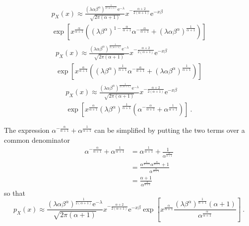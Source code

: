 \documentclass[12pt, a4paper]{memoir}
\newcommand{\euler}{\mathrm{e}}
\begin{document}
\begin{multline*}
p_X(x)\approx
\frac{\left(\lambda\alpha\beta^\alpha\right)^{\frac{1}{2(\alpha+1)}}\euler^{-\lambda}}{\sqrt{2\pi(\alpha+1)}}x^{-\frac{\alpha+2}{2(\alpha+1)}}
\euler^{-x\beta}
\\
\exp\left[x^{\frac{\alpha}{\alpha+1}}
	\left(
		(\lambda\beta^\alpha)^{1-\frac{\alpha}{\alpha+1}}\alpha^{-\frac{\alpha}{\alpha+1}}
		+\left(\lambda\alpha\beta^\alpha\right)^{\frac{1}{\alpha+1}}
	\right)
\right]
\end{multline*}
\begin{multline*}
p_X(x)\approx
\frac{\left(\lambda\alpha\beta^\alpha\right)^{\frac{1}{2(\alpha+1)}}\euler^{-\lambda}}{\sqrt{2\pi(\alpha+1)}}x^{-\frac{\alpha+2}{2(\alpha+1)}}\euler^{-x\beta}
\\
\exp\left[x^{\frac{\alpha}{\alpha+1}}
	\left(
		(\lambda\beta^\alpha)^{\frac{1}{\alpha+1}}\alpha^{-\frac{\alpha}{\alpha+1}}
		+\left(\lambda\alpha\beta^\alpha\right)^{\frac{1}{\alpha+1}}
	\right)
\right]
\end{multline*}
\begin{multline*}
p_X(x)\approx
\frac{\left(\lambda\alpha\beta^\alpha\right)^{\frac{1}{2(\alpha+1)}}\euler^{-\lambda}}{\sqrt{2\pi(\alpha+1)}}x^{-\frac{\alpha+2}{2(\alpha+1)}}\euler^{-x\beta}
\\
\exp\left[x^{\frac{\alpha}{\alpha+1}}(\lambda\beta^\alpha)^{\frac{1}{\alpha+1}}
	\left(
		\alpha^{-\frac{\alpha}{\alpha+1}}+\alpha^{\frac{1}{\alpha+1}}
	\right)
\right] \ .
\end{multline*}

The expression $\alpha^{-\frac{\alpha}{\alpha+1}}+\alpha^{\frac{1}{\alpha+1}}$ can be simplified by putting the two terms over a common denominator
\begin{align}
\alpha^{-\frac{\alpha}{\alpha+1}}+\alpha^{\frac{1}{\alpha+1}} & = \alpha^{\frac{1}{\alpha+1}}+\frac{1}{\alpha^{\frac{\alpha}{\alpha+1}}}
\nonumber\\
& = \frac{\alpha^{\frac{1}{\alpha+1}}\alpha^{\frac{\alpha}{\alpha+1}}+1}{\alpha^{\frac{\alpha}{\alpha+1}}}
\nonumber\\
& = \frac{\alpha+1}{\alpha^{\frac{\alpha}{\alpha+1}}}
\end{align}
so that
\begin{equation*}
p_X(x)\approx
\frac{\left(\lambda\alpha\beta^\alpha\right)^{\frac{1}{2(\alpha+1)}}\euler^{-\lambda}}{\sqrt{2\pi(\alpha+1)}}x^{-\frac{\alpha+2}{2(\alpha+1)}}
\euler^{-x\beta}
\exp\left[x^{\frac{\alpha}{\alpha+1}}
	\frac{(\lambda\beta^\alpha)^{\frac{1}{\alpha+1}}(\alpha+1)}{\alpha^{\frac{\alpha}{\alpha+1}}}
\right] \ .
\end{equation*}
\end{document}
